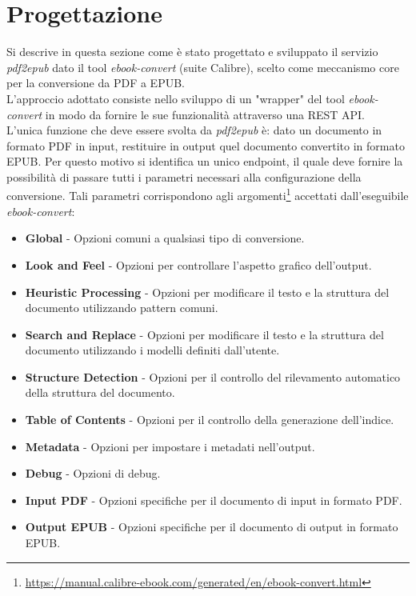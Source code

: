 \section{Progettazione}
Si descrive in questa sezione come è stato progettato e sviluppato il servizio \textit{pdf2epub} dato il tool \textit{ebook-convert} (suite Calibre), scelto come meccanismo core per la conversione da PDF a EPUB.\\
L'approccio adottato consiste nello sviluppo di un "wrapper" del tool \textit{ebook-convert} in modo da fornire le sue funzionalità attraverso una REST API.\\
L'unica funzione che deve essere svolta da \textit{pdf2epub} è: dato un documento in formato PDF in input, restituire in output quel documento convertito in formato EPUB. Per questo motivo si identifica un unico endpoint, il quale deve fornire la possibilità di passare tutti i parametri necessari alla configurazione della conversione. Tali parametri corrispondono agli argomenti\footnote{\url{https://manual.calibre-ebook.com/generated/en/ebook-convert.html}} accettati dall'eseguibile \textit{ebook-convert}:
\begin{itemize}
    \item \textbf{Global} - Opzioni comuni a qualsiasi tipo di conversione.
    \item \textbf{Look and Feel} - Opzioni per controllare l'aspetto grafico dell'output.
    \item \textbf{Heuristic Processing} - Opzioni per modificare il testo e la struttura del documento utilizzando pattern comuni.
    \item \textbf{Search and Replace} - Opzioni per modificare il testo e la struttura del documento utilizzando i modelli definiti dall'utente.
    \item \textbf{Structure Detection} - Opzioni per il controllo del rilevamento automatico della struttura del documento.
    \item \textbf{Table of Contents} - Opzioni per il controllo della generazione dell'indice.
    \item \textbf{Metadata} - Opzioni per impostare i metadati nell'output.
    \item \textbf{Debug} - Opzioni di debug.
    \item \textbf{Input PDF} - Opzioni specifiche per il documento di input in formato PDF.
    \item \textbf{Output EPUB} - Opzioni specifiche per il documento di output in formato EPUB.
\end{itemize}
